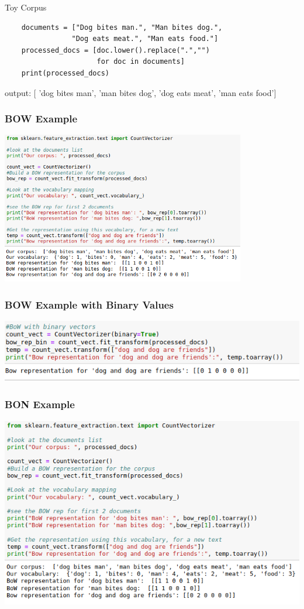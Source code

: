 \documentclass{beamer}
\begin{document}
\begin{frame}[fragile]{Toy Corpus}
\small
    \begin{verbatim}
    documents = ["Dog bites man.", "Man bites dog.", 
                "Dog eats meat.", "Man eats food."] 
    processed_docs = [doc.lower().replace(".","") 
                      for doc in documents]
    print(processed_docs)
    \end{verbatim}
    
    \footnotesize     
    output: $[$ 'dog bites man', 'man bites dog', 'dog eats meat', 'man eats food'$]$
\end{frame}

\begin{frame}
\frametitle{BOW Example}
\includegraphics[width=0.8\textwidth]{figures/bowexample.png}
\end{frame}

\begin{frame}
\frametitle{BOW Example with Binary Values}
\includegraphics[width=\textwidth]{figures/bowbinaryrep.png}
\end{frame}

\begin{frame}
\frametitle{BON Example}
\includegraphics[width=\textwidth]{figures/bowexample.png}
\end{frame}
\end{document}
